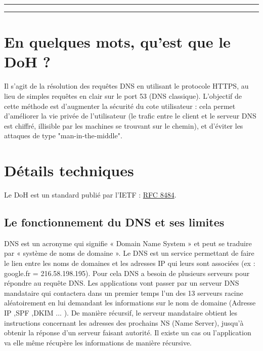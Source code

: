 \documentclass[a4paper,12pt]{article}
\begin{document}
\begin{titlepage}
		\vspace{0.1\textheight} %
		
		
		\centering
		
		\rule{\textwidth}{0.4pt} %
		
		\vspace{2pt}\vspace{-\baselineskip} %
		
		\rule{\textwidth}{1pt} %
		
	\end{titlepage}
	
	\setcounter{page}{1}
	
	\hspace{2cm}
	\tableofcontents
	
	\newpage
	
	\section{En quelques mots, qu'est que le DoH ?}
	Il s'agit de la résolution des requêtes DNS en utilisant le protocole HTTPS, au lieu de simples requêtes en clair sur le port 53 (DNS classique). L'objectif de cette méthode est d'augmenter la sécurité du cote utilisateur : cela permet d'améliorer la vie privée de l'utilisateur (le trafic entre le client et le serveur DNS est chiffré, illisible par les machines se trouvant sur le chemin), et d'éviter les attaques de type "man-in-the-middle".
	
	\section{Détails techniques}
	Le DoH est un standard publié par l'IETF : \href{https://tools.ietf.org/html/rfc8484}{RFC 8484}.
	
	\subsection{Le fonctionnement du DNS et ses limites}
	DNS est un acronyme qui signifie « Domain Name System » et peut se traduire par « système de noms de domaine ».
	Le DNS est un service permettant de faire le lien entre les noms de domaines et les adresses IP qui leurs sont associées (ex : google.fr = 216.58.198.195).
	Pour cela DNS a besoin de plusieurs serveurs pour répondre au requête DNS. 
	Les applications vont passer par un serveur DNS mandataire qui contactera dans un premier temps l'un des 13 serveurs racine aléatoirement en lui demandant les informations sur le nom de domaine (Adresse IP ,SPF ,DKIM ... ). De manière récursif, le serveur mandataire obtient les instructions concernant les adresses des prochains NS (Name Server), jusqu'à obtenir la réponse d'un serveur faisant autorité. Il existe un cas ou l'application va elle même récupère les informations de manière récursive.
	
\end{document}
